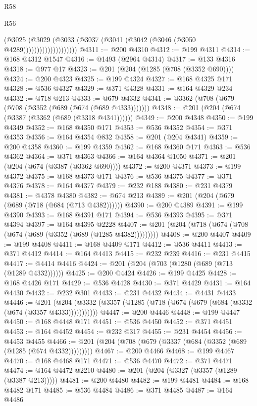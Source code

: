 \begin{lexlean}{R58}
\begin{lexlean}{R56}
\begin{coremodule}
{{{{{{{{{{{{{{{{{{{{{{{{{{{{{{{{{{{{{{{{{{{{{{{{{{{{{{{{{{{{{{{{{{{{{{{{{{{{{{{{{{{{{{{{{{{{{{{{{{{{{{{{{{{{{{{{{{{{{{{{{{{{{{{{{{{{{{{{{{{{{{{{{{{{{{{{{{{{{{{{{{{{{{{{{{{{{{{{{{{{{{{{{{{{{{{{{{{{{{{{{{{{{{{{{{{                            (@3025
                              (@3029
                                (@3033 (@3037 (@3041 (@3042 (@3046 (@3050 @4289))))))))))))))))))))
@4311 := @200 @4310
@4312 := @199 @4311
@4314 := @168 @4312 @1547
@4316 := @1493 (@2964 @4314)
@4317 := @133 @4316
@4318 := @977 @17
@4323 := @201 (@204 (@1285 (@708 (@3352 @690))))
@4324 := @200 @4323
@4325 := @199 @4324
@4327 := @168 @4325 @171
@4328 := @536 @4327
@4329 := @371 @4328
@4331 := @164 @4329 @234
@4332 := @718 @213
@4333 := @679 @4332
@4341 := @3362 (@708 (@679 (@708 (@3352 (@689 (@674 (@689 @4333)))))))
@4348 := @201 (@204 (@674 (@3387 (@3362 (@689 (@3318 @4341))))))
@4349 := @200 @4348
@4350 := @199 @4349
@4352 := @168 @4350 @171
@4353 := @536 @4352
@4354 := @371 @4353
@4356 := @164 @4354 @832
@4358 := @201 (@204 @4341)
@4359 := @200 @4358
@4360 := @199 @4359
@4362 := @168 @4360 @171
@4363 := @536 @4362
@4364 := @371 @4363
@4366 := @164 @4364 @1050
@4371 := @201 (@204 (@674 (@3387 (@3362 @690))))
@4372 := @200 @4371
@4373 := @199 @4372
@4375 := @168 @4373 @171
@4376 := @536 @4375
@4377 := @371 @4376
@4378 := @164 @4377
@4379 := @232 @188
@4380 := @231 @4379
@4381 := @4378 @4380
@4382 := @674 @213
@4389 := @201 (@204 (@679 (@689 (@718 (@684 (@713 @4382))))))
@4390 := @200 @4389
@4391 := @199 @4390
@4393 := @168 @4391 @171
@4394 := @536 @4393
@4395 := @371 @4394
@4397 := @164 @4395 @2228
@4407 := @201 (@204 (@718 (@674 (@708 (@674 (@689 (@3352 (@689 (@1285 @4382)))))))))
@4408 := @200 @4407
@4409 := @199 @4408
@4411 := @168 @4409 @171
@4412 := @536 @4411
@4413 := @371 @4412
@4414 := @164 @4413
@4415 := @232 @239
@4416 := @231 @4415
@4417 := @4414 @4416
@4424 := @201 (@204 (@703 (@1280 (@689 (@713 (@1289 @4332))))))
@4425 := @200 @4424
@4426 := @199 @4425
@4428 := @168 @4426 @171
@4429 := @536 @4428
@4430 := @371 @4429
@4431 := @164 @4430
@4432 := @232 @301
@4433 := @231 @4432
@4434 := @4431 @4433
@4446 := @201
    (@204 (@3332 (@3357 (@1285 (@718 (@674 (@679 (@684 (@3332 (@674 (@3357 @4333)))))))))))
@4447 := @200 @4446
@4448 := @199 @4447
@4450 := @168 @4448 @171
@4451 := @536 @4450
@4452 := @371 @4451
@4453 := @164 @4452
@4454 := @232 @317
@4455 := @231 @4454
@4456 := @4453 @4455
@4466 := @201 (@204 (@708 (@679 (@3337 (@684 (@3352 (@689 (@1285 (@674 @4332)))))))))
@4467 := @200 @4466
@4468 := @199 @4467
@4470 := @168 @4468 @171
@4471 := @536 @4470
@4472 := @371 @4471
@4474 := @164 @4472 @2210
@4480 := @201 (@204 (@3327 (@3357 (@1289 (@3387 @213)))))
@4481 := @200 @4480
@4482 := @199 @4481
@4484 := @168 @4482 @171
@4485 := @536 @4484
@4486 := @371 @4485
@4487 := @164 @4486
}}}}}}}}}}}}}}}}}}}}}}}}}}}}}}}}}}}}}}}}}}}}}}}}}}}}}}}}}}}}}}}}}}}}}}}}}}}}}}}}}}}}}}}}}}}}}}}}}}}}}}}}}}}}}}}}}}}}}}}}}}}}}}}}}}}}}}}}}}}}}}}}}}}}}}}}}}}}}}}}}}}}}}}}}}}}}}}}}}}}}}}}}}}}}}}}}}}}}}}}}}}}}}}}}}}
\end{coremodule}
\end{lexlean}
\end{lexlean}
